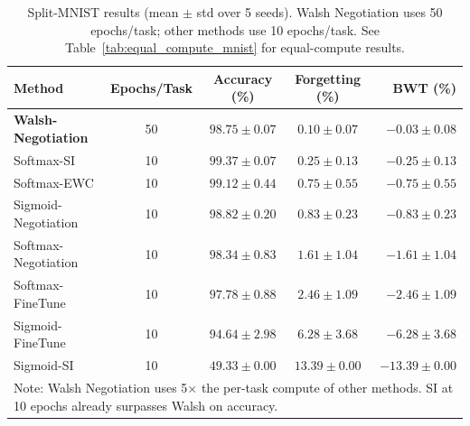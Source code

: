 \documentclass[preprint,review,12pt]{elsarticle}
\begin{document}
\begin{table}[t]
\centering
\caption{Split-MNIST results (mean $\pm$ std over 5 seeds). Walsh Negotiation uses 50 epochs/task; other methods use 10 epochs/task. See Table~\ref{tab:equal_compute_mnist} for equal-compute results.}
\label{tab:mnist_multiseed}
\begin{tabular}{lcccr}
\toprule
Method & Epochs/Task & Accuracy (\%) & Forgetting (\%) & BWT (\%) \\
\midrule
\textbf{Walsh-Negotiation} & 50 & $98.75 \pm 0.07$ & $\mathbf{0.10 \pm 0.07}$ & $\mathbf{-0.03 \pm 0.08}$ \\
Softmax-SI & 10 & $\mathbf{99.37 \pm 0.07}$ & $0.25 \pm 0.13$ & $-0.25 \pm 0.13$ \\
Softmax-EWC & 10 & $99.12 \pm 0.44$ & $0.75 \pm 0.55$ & $-0.75 \pm 0.55$ \\
Sigmoid-Negotiation & 10 & $98.82 \pm 0.20$ & $0.83 \pm 0.23$ & $-0.83 \pm 0.23$ \\
Softmax-Negotiation & 10 & $98.34 \pm 0.83$ & $1.61 \pm 1.04$ & $-1.61 \pm 1.04$ \\
Softmax-FineTune & 10 & $97.78 \pm 0.88$ & $2.46 \pm 1.09$ & $-2.46 \pm 1.09$ \\
Sigmoid-FineTune & 10 & $94.64 \pm 2.98$ & $6.28 \pm 3.68$ & $-6.28 \pm 3.68$ \\
\midrule
Sigmoid-SI & 10 & $49.33 \pm 0.00$ & $13.39 \pm 0.00$ & $-13.39 \pm 0.00$ \\
\bottomrule
\multicolumn{5}{l}{\scriptsize Note: Walsh Negotiation uses 5$\times$ the per-task compute of other methods. SI at 10 epochs already surpasses Walsh on accuracy.}
\end{tabular}
\end{table}
\end{document}
